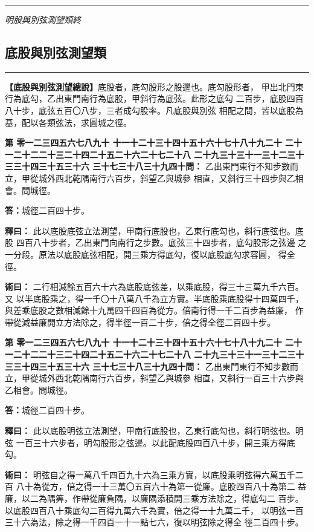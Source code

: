 \documentclass[11pt,a4paper]{article}
\newcommand{\longline}{\noindent\rule{\textwidth}{0.4pt}}
\newcounter{probnum}
\newcommand{\chnum}[1]{%
  \ifcase#1 零\or 一\or 二\or 三\or 四\or 五\or 六\or 七\or 八\or 九\or 十\or
    十一\or 十二\or 十三\or 十四\or 十五\or 十六\or 十七\or 十八\or 十九\or 二十\or
    二十一\or 二十二\or 二十三\or 二十四\or 二十五\or 二十六\or 二十七\or 二十八\or
    二十九\or 三十\or 三十一\or 三十二\or 三十三\or 三十四\or 三十五\or 三十六\or
    三十七\or 三十八\or 三十九\or 四十\fi}
\newcommand{\problem}[1]{\stepcounter{probnum}\par\noindent\textbf{第\chnum{\value{probnum}}問：}#1\par}
\newcommand{\answer}[1]{\par\noindent\textbf{答：}#1\par}
\newcommand{\shiyi}[1]{\par\noindent\textbf{釋曰：}#1\par}
\newcommand{\shuyue}[1]{\par\noindent\textbf{術曰：}#1\par}
\begin{document}
\vspace{0.5cm}
\longline
\begin{center}
\textit{明股與別弦測望類終}
\end{center}

\newpage
\setcounter{probnum}{0}

\subsection*{底股與別弦測望類}
\vspace{0.3cm}
\longline
\vspace{0.3cm}

\noindent
\textbf{【底股與別弦測望總說】}底股者，底勾股形之股邊也。底勾股形者，
甲出北門東行為底勾，乙出東門南行為底股，甲斜行為底弦。此形之底勾
二百步，底股四百八十步，底弦五百〇八步，三者成勾股率。凡底股與別弦
相配之問，皆以底股為基，配以各類弦法，求圓城之徑。

\problem{
乙出東門東行不知步數而立，甲從城外西北乾隅南行六百步，斜望乙與城參
相直，又斜行三十四步與乙相會。問城徑。
}

\answer{城徑二百四十步。}

\shiyi{
此以底股底弦立法測望，甲南行底股也，乙東行底勾也，斜行底弦也。底股
四百八十步者，乙出東門向南行之步數。底弦三十四步者，底勾股形之弦邊
之一分段。原法以底股底弦相配，開三乘方得底勾，復以底股底勾求容圓，
得全徑。
}

\shuyue{
二行相減餘五百六十六為底股底弦差，以乘底股，得三十三萬九千六百。又
以半底股乘之，得一千〇十八萬八千為立方實。半底股乘底股得十四萬四千，
與差乘底股之數相減餘十九萬四千四百為從方。倍南行得一千二百步為益廉，
作帶從減益廉開立方法除之，得半徑一百二十步，倍之得全徑二百四十步。
}

\vspace{0.3cm}
\problem{
乙出東門東行不知步數而立，甲從城外西北乾隅南行六百步，斜望乙與城參
相直，又斜行一百三十六步與乙相會。問城徑。
}

\answer{城徑二百四十步。}

\shiyi{
此以底股明弦立法測望，甲南行底股也，乙東行底勾也，斜行明弦也。明弦
一百三十六步者，明勾股形之弦邊。以此配底股四百八十步，開三乘方得底勾。
}

\shuyue{
明弦自之得一萬八千四百九十六為三乘方實，以底股乘明弦得六萬五千二百
八十為從方，倍之得一十三萬〇五百六十為第一從廉。底股四百八十為第二
益廉，以二為隅筭，作帶從廉負隅，以廉隅添積開三乘方法除之，得底勾二
百步。以底股四百八十乘底勾二百得九萬六千為實，倍之得一十九萬二千，
以明弦一百三十六為法，除之得一千四百一十一點七六，復以明弦除之得全
徑二百四十步。
}
\end{document}
